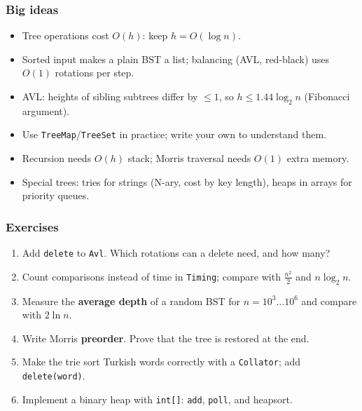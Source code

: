 \documentclass[aspectratio=169,10pt,compress]{beamer}
\begin{document}
\begin{frame}[t,fragile] \frametitle{Big ideas}
  \begin{itemize}
    \item Tree operations cost $O(h)$: keep $h = O(\log n)$.
    \item Sorted input makes a plain BST a list; balancing (AVL, red-black) uses $O(1)$ rotations per step.
    \item AVL: heights of sibling subtrees differ by $\le 1$, so $h \le 1.44 \log_{2} n$ (Fibonacci argument).
    \item Use \texttt{TreeMap}/\texttt{TreeSet} in practice; write your own to understand them.
    \item Recursion needs $O(h)$ stack; Morris traversal needs $O(1)$ extra memory.
    \item Special trees: tries for strings (N-ary, cost by key length), heaps in arrays for priority queues.
  \end{itemize}
\end{frame}




\begin{frame}[t,fragile] \frametitle{Exercises}
  \begin{enumerate}\small
    \item Add \texttt{delete} to \texttt{Avl}. Which rotations can a delete need, and how many?
    \item Count comparisons instead of time in \texttt{Timing}; compare with $\frac{n^{2}}{2}$ and $n \log_{2} n$.
    \item Measure the \textbf{average depth} of a random BST for $n = 10^{3} \dots 10^{6}$ and compare with $2 \ln n$.
    \item Write Morris \textbf{preorder}. Prove that the tree is restored at the end.
    \item Make the trie sort Turkish words correctly with a \texttt{Collator}; add \texttt{delete(word)}.
    \item Implement a binary heap with \texttt{int[]}: \texttt{add}, \texttt{poll}, and heapsort.
  \end{enumerate}
\end{frame}




\begin{frame}[t,fragile]
	\begin{center}
		\vspace{4cm}
	\end{center}
\end{frame}
\end{document}
